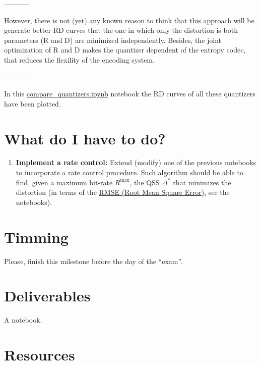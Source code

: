 -----------

However, there is not
(yet) any known reason to think that this approach will be generate
better RD curves that the one in which only the distortion is both parameters (R and D) are
minimized independently. Besides, the joint optimization of R and D
makes the quantizer dependent of the entropy codec, that reduces the
flexility of the encoding system.

-----------

In this
\href{https://github.com/Sistemas-Multimedia/Sistemas-Multimedia.github.io/blob/master/contents/gray_SQ/compare_quantizers.ipynb}{compare\_quantizers.ipynb}
notebook the RD curves of all these quantizers have been plotted.


\section{What do I have to do?}
\begin{enumerate}
\item \textbf{Implement a rate control:} Extend (modify) one of the
  previous notebooks to incorporate a rate control procedure. Such
  algorithm should be able to find, given a maximum bit-rate
  $R^\text{max}$, the QSS $\Delta^*$ that minimizes the distortion (in
  terms of the
  \href{https://en.wikipedia.org/wiki/Root-mean-square_deviation}{RMSE
    (Root Mean Square Error)}, see the notebooks).
\end{enumerate}

\section{Timming}
Please, finish this milestone before the day of the ``exam''.

\section{Deliverables}
A notebook.

\section{Resources}
\renewcommand{\addcontentsline}[3]{} %



